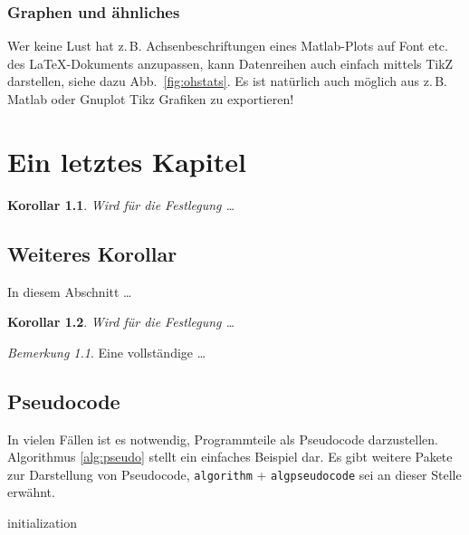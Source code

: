 \documentclass[12pt,DIV=15,BCOR=15mm,twoside,headsepline,abstract=true,listof=totoc,bibliography=totoc]{scrreprt}
\newtheorem{kor}{Korollar}
\theoremstyle{remark}    %
\newtheorem{bem}{Bemerkung}
\begin{document}
    \subsection{Graphen und ähnliches}
    Wer keine Lust hat z.\,B. Achsenbeschriftungen eines Matlab-Plots auf Font etc. des \LaTeX -Dokuments anzupassen, kann Datenreihen auch einfach mittels TikZ darstellen, siehe dazu Abb.~\ref{fig:ohstats}. Es ist natürlich auch möglich aus z.\,B. Matlab oder Gnuplot Tikz Grafiken zu exportieren!
    


    \chapter{Ein letztes Kapitel}
    \begin{kor}
        \label{kor2}
        Wird f\"{u}r die Festlegung  \dots
    \end{kor}


    \section{Weiteres Korollar}
    In diesem Abschnitt  \dots
    \begin{kor}
        \label{kor3}
        Wird f\"{u}r die Festlegung  \dots
    \end{kor}

    \begin{bem}
        \label{bem3}
        Eine vollst\"{a}ndige  \dots
    \end{bem}


    \section{Pseudocode}
    In vielen Fällen ist es notwendig, Programmteile als Pseudocode darzustellen. Algorithmus \ref{alg:pseudo} stellt ein einfaches Beispiel dar. Es gibt weitere Pakete zur Darstellung von Pseudocode, \texttt{algorithm} + \texttt{algpseudocode} sei an dieser Stelle erwähnt.

    \begin{algorithm}[ht]
        initialization\;
        \caption{How to write algorithms}\label{alg:pseudo}
    \end{algorithm}
\end{document}

